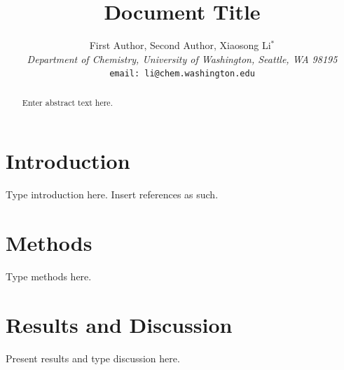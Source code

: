 \documentclass[12pt]{article}
\begin{document}
\title{Document Title}
\author{First Author, Second Author, Xiaosong Li$^*$ \\[12pt]
\emph{Department of Chemistry, University of Washington, Seattle, WA 98195} \\[12pt]
\texttt{email: li@chem.washington.edu}}
\date{}
\maketitle

\begin{abstract}
	Enter abstract text here.
\end{abstract}
\newpage

\section*{Introduction}

Type introduction here.  Insert references as such.\cite{Li12_2898, Li12_22A512, Li12_1374, Li12_11223, Li11_144102, Li11_024118, Li06_835, GDVH21}

\section*{Methods}

Type methods here.

\section*{Results and Discussion}

Present results and type discussion here.

\end{document}
